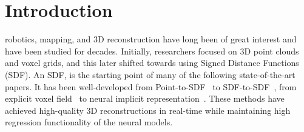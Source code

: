 
\section{Introduction}

 robotics, mapping, and 3D reconstruction have long been of great interest and have been studied for decades.
Initially, researchers focused on 3D point clouds and voxel grids, and this later shifted towards using Signed Distance Functions (SDF).
%
An SDF, is the starting point of many of the following state-of-the-art papers.
It has been well-developed from Point-to-SDF~\cite{bylow2013real} to SDF-to-SDF~\cite{slavcheva2016sdf,yuan2022indirect}, from explicit voxel field~\cite{niessner2013real} to neural implicit representation~\cite{huang2021di,yuan2022algorithm}. 
These methods have achieved high-quality 3D reconstructions in real-time while maintaining high regression functionality of the neural models.

